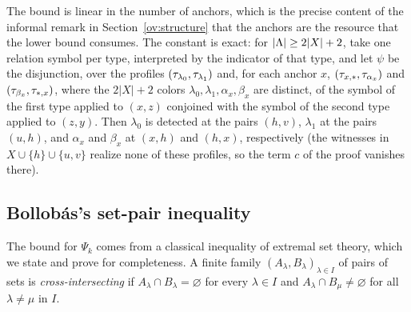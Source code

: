 The bound is linear in the number of anchors, which is the precise content
of the informal remark in Section~\ref{ov:structure} that the anchors are
the resource that the lower bound consumes. The constant is exact: for
$|\Lambda|\ge2|X|+2$, take one relation symbol per type, interpreted by the
indicator of that type, and let $\psi$ be the disjunction, over the profiles
$(\tau_{\lambda_0},\tau_{\lambda_1})$ and, for each anchor $x$,
$(\tau_{x,\ast},\tau_{\alpha_x})$ and $(\tau_{\beta_x},\tau_{\ast,x})$, where the
$2|X|+2$ colors $\lambda_0,\lambda_1,\alpha_x,\beta_x$ are distinct, of the
symbol of the first type applied to $(x,z)$ conjoined with the symbol of
the second type applied to $(z,y)$. Then $\lambda_0$ is detected at the pairs $(h,v)$,
$\lambda_1$ at the pairs $(u,h)$, and $\alpha_x$ and $\beta_x$ at $(x,h)$
and $(h,x)$, respectively (the witnesses in $X\cup\{h\}\cup\{u,v\}$ realize
none of these profiles, so the term $c$ of the proof vanishes there).

\subsection{Bollob\'as's set-pair inequality}\label{app:bollobas}
The bound for $\Psi_k$ comes from a classical inequality of extremal set
theory, which we state and prove for completeness. A finite family
$(A_\lambda,B_\lambda)_{\lambda\in I}$ of pairs of sets is
\emph{cross-intersecting} if $A_\lambda\cap B_\lambda=\varnothing$ for every
$\lambda\in I$ and $A_\lambda\cap B_\mu\ne\varnothing$ for all
$\lambda\ne\mu$ in $I$.

